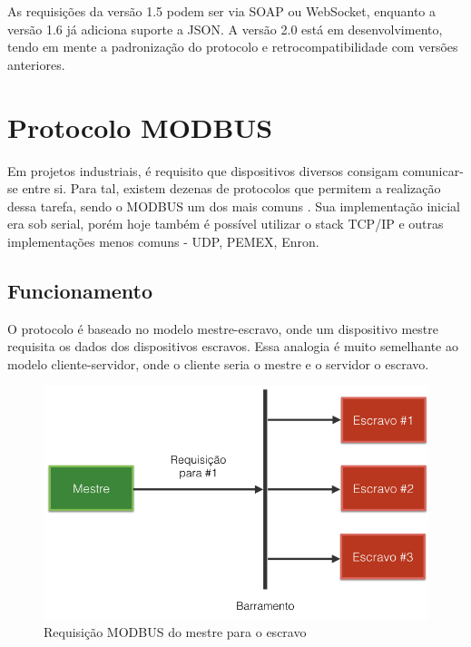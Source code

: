 As requisições da versão 1.5 podem ser via SOAP ou WebSocket, enquanto a versão 1.6 já adiciona suporte a JSON. A versão 2.0 está em desenvolvimento, tendo em mente a padronização do protocolo e retrocompatibilidade com versões anteriores. 

\section{Protocolo MODBUS}

Em projetos industriais, é requisito que dispositivos diversos consigam comunicar-se entre si. Para tal, existem dezenas de protocolos que permitem a realização dessa tarefa, sendo o MODBUS um dos mais comuns \cite{modbus-spec-application}. Sua implementação inicial era sob serial, porém hoje também é possível utilizar o stack TCP/IP e outras implementações menos comuns - UDP, PEMEX, Enron.

\subsection{Funcionamento}

O protocolo é baseado no modelo mestre-escravo, onde um dispositivo mestre requisita os dados dos dispositivos escravos. Essa analogia é muito semelhante ao modelo cliente-servidor, onde o cliente seria o mestre e o servidor o escravo.

\begin{figure}[H]
        \begin{center}
                \includegraphics[width=\textwidth,natwidth=1024,natheight=768]{assets/images/modbus-req-1.png}
                \caption{Requisição MODBUS do mestre para o escravo}
                \label{fig:modbus-req-1}
        \end{center}
\end{figure}

